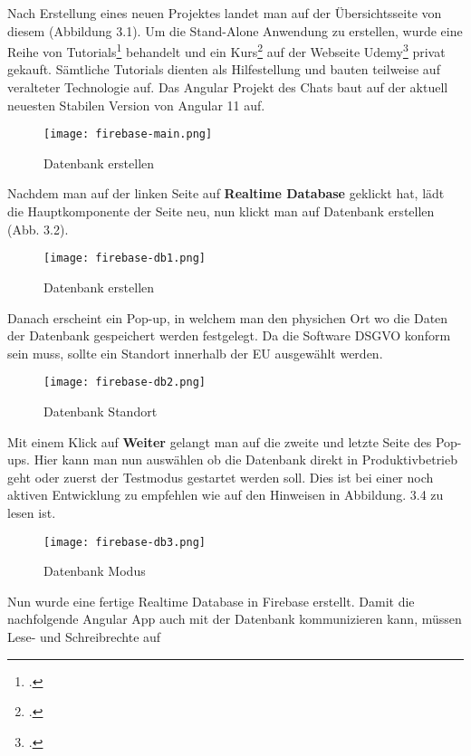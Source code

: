 Nach Erstellung eines neuen Projektes landet man auf der Übersichtsseite
von diesem (Abbildung 3.1). Um die Stand-Alone Anwendung zu erstellen, wurde eine Reihe von Tutorials\footcite{firebase-yt-tut} behandelt und ein Kurs\footcite{firebase-tut1} auf der Webseite Udemy\footcite{udemy-course} privat gekauft.
Sämtliche Tutorials dienten als Hilfestellung und bauten teilweise auf veralteter Technologie auf. Das Angular Projekt des Chats baut auf der aktuell neuesten Stabilen Version von Angular 11 auf.
\begin{center}
    \begin{figure}[H]
        \centering
        \texttt{[image: firebase-main.png]}
        \caption{Datenbank erstellen}
    \end{figure}
\end{center}
Nachdem man auf der linken Seite auf \textbf{Realtime Database} geklickt hat, lädt die Hauptkomponente der Seite neu, nun klickt man auf Datenbank erstellen (Abb. 3.2).
\begin{center}
    \begin{figure}[H]
        \centering
        \texttt{[image: firebase-db1.png]}
        \caption{Datenbank erstellen}
    \end{figure}
\end{center}
Danach erscheint ein Pop-up, in welchem man den physichen Ort wo die Daten der Datenbank gespeichert werden festgelegt. Da die Software DSGVO konform sein muss, sollte ein Standort innerhalb der EU ausgewählt werden.
\begin{center}
    \begin{figure}[H]
        \centering
        \texttt{[image: firebase-db2.png]}
        \caption{Datenbank Standort}
    \end{figure}
\end{center}
Mit einem Klick auf \textbf{Weiter} gelangt man auf die zweite und letzte Seite des Pop-ups. Hier kann man nun auswählen ob die Datenbank direkt in Produktivbetrieb geht oder zuerst der Testmodus gestartet werden soll. Dies ist bei einer
noch aktiven Entwicklung zu empfehlen wie auf den Hinweisen in Abbildung. 3.4 zu lesen ist.
\begin{center}
    \begin{figure}[H]
        \centering
        \texttt{[image: firebase-db3.png]}
        \caption{Datenbank Modus}
    \end{figure}
\end{center}
Nun wurde eine fertige Realtime Database in Firebase erstellt. Damit die nachfolgende Angular App auch mit der Datenbank kommunizieren kann, müssen Lese- und Schreibrechte auf
